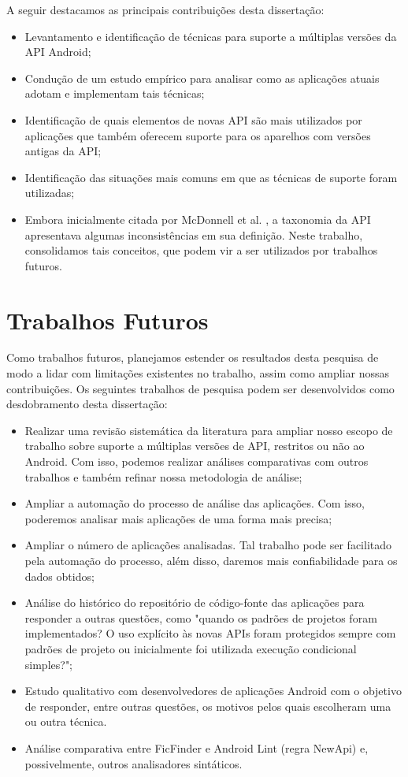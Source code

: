 A seguir destacamos as principais contribuições desta dissertação:
\begin{itemize}
	\item Levantamento e identificação de técnicas para suporte a múltiplas versões
		da API Android;
	\item Condução de um estudo empírico para analisar como as aplicações atuais
		adotam e implementam tais técnicas;
	\item Identificação de quais elementos de novas API são mais utilizados por
		aplicações que também oferecem suporte para os aparelhos com versões antigas
		da API;
	\item Identificação das situações mais comuns em que as técnicas de suporte
		foram utilizadas;
	\item Embora inicialmente citada por McDonnell et al. \cite{McDonnell2013},
		a taxonomia da API apresentava algumas inconsistências em sua definição.
		Neste trabalho, consolidamos tais conceitos, que podem vir a ser utilizados
		por trabalhos futuros.
\end{itemize}

\section{Trabalhos Futuros}\label{sec:trabalhos_futuros}

Como trabalhos futuros, planejamos estender os resultados desta pesquisa
de modo a lidar com limitações existentes no trabalho, assim como ampliar 
nossas contribuições. Os seguintes trabalhos de pesquisa podem ser desenvolvidos
como desdobramento desta dissertação:

\begin{itemize}
	\item Realizar uma revisão sistemática da literatura para ampliar nosso
		escopo de trabalho sobre suporte a múltiplas versões de API, restritos
		ou não ao Android. Com isso, podemos realizar análises comparativas com
		outros trabalhos e também refinar nossa metodologia de análise;
	\item Ampliar a automação do processo de análise das aplicações. Com isso,
		poderemos analisar mais aplicações de uma forma mais precisa;
	\item Ampliar o número de aplicações analisadas. Tal trabalho pode ser facilitado
		pela automação do processo, além disso, daremos mais confiabilidade para os
		dados obtidos;
	\item Análise do histórico do repositório de código-fonte das aplicações para
		responder a outras questões, como "quando os padrões de projetos foram
		implementados? O uso explícito às novas APIs foram protegidos sempre com
		padrões de projeto ou inicialmente foi utilizada execução condicional simples?"; 
	\item Estudo qualitativo com desenvolvedores de aplicações Android com o objetivo
		de responder, entre outras questões, os motivos pelos quais escolheram uma ou
		outra técnica.
	\item Análise comparativa entre FicFinder e Android Lint (regra NewApi) e,
		possivelmente, outros analisadores sintáticos.
\end{itemize}
